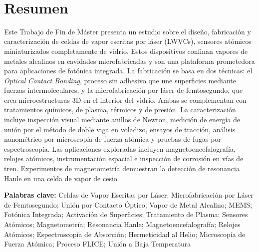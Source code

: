 \documentclass[11pt,english,a4paper,hidelinks]{book}
\begin{document}

\newpage
\thispagestyle{empty}\
\newpage
\thispagestyle{empty}

\section*{Resumen}
\noindent
Este Trabajo de Fin de Máster presenta un estudio sobre el diseño,
fabricación y caracterización de celdas de vapor escritas por láser
(LWVCs), sensores atómicos miniaturizados completamente de vidrio.
Estos dispositivos confinan vapores de metales alcalinos en cavidades
microfabricadas y son una plataforma prometedora para aplicaciones de
fotónica integrada. La fabricación se basa en dos técnicas: el
\textit{Optical Contact Bonding}, proceso sin adhesivo que une
superficies mediante fuerzas intermoleculares, y la microfabricación
por láser de femtosegundo, que crea microestructuras 3D en el interior
del vidrio. Ambas se complementan con tratamientos químicos, de plasma,
térmicos y de presión. La caracterización incluye inspección visual
mediante anillos de Newton, medición de energía de unión por el método
de doble viga en voladizo, ensayos de tracción, análisis nanométrico
por microscopía de fuerza atómica y pruebas de fugas por espectroscopía.
Las aplicaciones exploradas incluyen magnetoencefalografía, relojes
atómicos, instrumentación espacial e inspección de corrosión en vías
de tren. Experimentos de magnetometría demuestran la detección de
resonancia Hanle en una celda de vapor de cesio.

\vspace{0.8em}
\noindent\textbf{Palabras clave:}
Celdas de Vapor Escritas por Láser; Microfabricación por Láser de
Femtosegundo; Unión por Contacto Óptico; Vapor de Metal Alcalino;
MEMS; Fotónica Integrada; Activación de Superficies; Tratamiento de
Plasma; Sensores Atómicos; Magnetometría; Resonancia Hanle;
Magnetoencefalografía; Relojes Atómicos; Espectroscopía de Absorción;
Hermeticidad al Helio; Microscopía de Fuerza Atómica; Proceso FLICE;
Unión a Baja Temperatura

\end{document}
